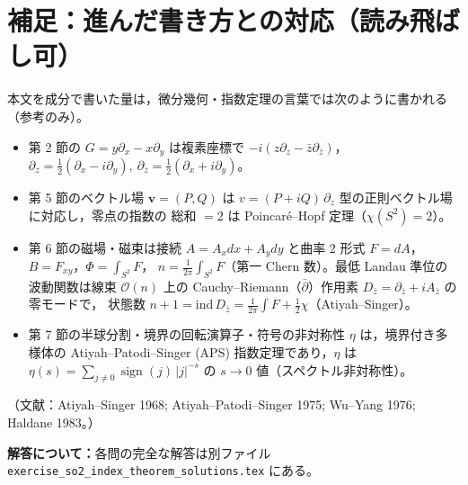 \documentclass[dvipdfmx, uplatex]{jsarticle}
\theoremstyle{definition}
\begin{document}
\section*{補足：進んだ書き方との対応（読み飛ばし可）}
本文を成分で書いた量は，微分幾何・指数定理の言葉では次のように書かれる（参考のみ）。
\begin{itemize}
\item 第 2 節の $G=y\partial_x-x\partial_y$ は複素座標で $-i(z\partial_z-\bar z\partial_{\bar z})$，
$\partial_z=\tfrac12(\partial_x-i\partial_y),\ \partial_{\bar z}=\tfrac12(\partial_x+i\partial_y)$。
\item 第 5 節のベクトル場 $\bm v=(P,Q)$ は $v=(P+iQ)\,\partial_z$ 型の正則ベクトル場に対応し，零点の指数の
総和 $=2$ は Poincar\'e--Hopf 定理（$\chi(S^2)=2$）。
\item 第 6 節の磁場・磁束は接続 $A=A_x dx+A_y dy$ と曲率 2 形式 $F=dA$，$B=F_{xy}$，$\Phi=\int_{S^2}F$，
$n=\frac1{2\pi}\int_{S^2}F$（第一 Chern 数）。最低 Landau 準位の波動関数は線束 $\mathcal O(n)$ 上の
Cauchy--Riemann（$\bar\partial$）作用素 $D_{\bar z}=\partial_{\bar z}+iA_{\bar z}$ の零モードで，
状態数 $n+1=\mathrm{ind}\,D_{\bar z}=\frac1{2\pi}\int F+\tfrac12\chi$（Atiyah--Singer）。
\item 第 7 節の半球分割・境界の回転演算子・符号の非対称性 $\eta$ は，境界付き多様体の
Atiyah--Patodi--Singer (APS) 指数定理であり，$\eta$ は $\eta(s)=\sum_{j\neq0}\operatorname{sign}(j)\,|j|^{-s}$ の
$s\to0$ 値（スペクトル非対称性）。
\end{itemize}
（文献：Atiyah--Singer 1968; Atiyah--Patodi--Singer 1975; Wu--Yang 1976; Haldane 1983。）

\bigskip
{\sloppy
\noindent\textbf{解答について：}各問の完全な解答は別ファイル
\texttt{exercise\_so2\_index\_theorem\_solutions.tex} にある。
\par}
\end{document}

